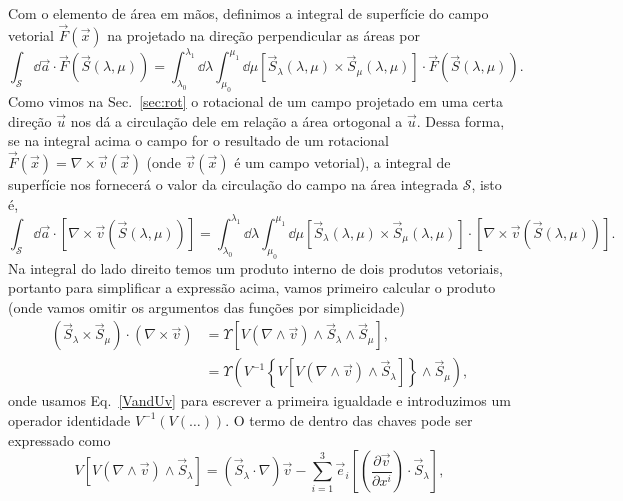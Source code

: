 Com o elemento de área em mãos, definimos a integral de superfície do campo
vetorial $\vec{F}(\vec{x})$ na projetado na direção perpendicular as áreas por
\begin{equation}\label{intsurf}
	\int_{\mathcal{S}} \dd \vec{a}\cdot \vec{F}(\vec{S}(\lambda,\mu)) = \int_{\lambda_0}^{\lambda_1}\dd \lambda\int_{\mu_0}^{\mu_1}\dd \mu \left[\vec{S}_\lambda(\lambda,\mu)\times\vec{S}_\mu(\lambda,\mu)\right]\cdot \vec{F}(\vec{S}(\lambda,\mu)).
\end{equation}
Como vimos  na Sec.~\ref{sec:rot} o rotacional de um campo projetado em uma
certa direção $\vec{u}$ nos dá a circulação dele em relação a área ortogonal a
$\vec{u}$. Dessa forma, se na integral acima o campo for o resultado de um
rotacional $\vec{F}(\vec{x}) = \nabla\times\vec{v}(\vec{x})$ (onde
$\vec{v}(\vec{x})$ é um campo vetorial), a integral de superfície nos fornecerá
o valor da circulação do campo na área integrada $\mathcal{S}$, isto é,
\begin{equation}
	\int_{\mathcal{S}} \dd \vec{a}\cdot \left[\nabla\times\vec{v}\left(\vec{S}(\lambda,\mu)\right)\right] =  \int_{\lambda_0}^{\lambda_1}\dd \lambda\int_{\mu_0}^{\mu_1}\dd \mu \left[\vec{S}_\lambda(\lambda,\mu)\times\vec{S}_\mu(\lambda,\mu)\right]\cdot\left[\nabla\times\vec{v}\left(\vec{S}(\lambda,\mu)\right)\right].
\end{equation}
Na integral do lado direito temos um produto interno de dois produtos vetoriais,
portanto para simplificar a expressão acima, vamos primeiro calcular o produto
(onde vamos omitir os argumentos das funções por simplicidade)
\begin{align}
	\left(\vec{S}_\lambda\times\vec{S}_\mu\right)\cdot\left(\nabla\times\vec{v}\right) & = \Upsilon\left[V\left(\nabla\wedge\vec{v}\right)\wedge\vec{S}_\lambda\wedge\vec{S}_\mu\right],                                   \\
	                                                                                   & =\Upsilon\left(V^{-1}\left\{V\left[V\left(\nabla\wedge\vec{v}\right)\wedge\vec{S}_\lambda\right]\right\}\wedge\vec{S}_\mu\right),
\end{align}
onde usamos Eq.~\eqref{VandUv} para escrever a primeira igualdade e introduzimos
um operador identidade $V^{-1}(V(\dots))$. O termo de dentro das chaves pode ser
expressado como
\begin{equation}
	V\left[V\left(\nabla\wedge\vec{v}\right)\wedge\vec{S}_\lambda\right] = (\vec{S}_\lambda\cdot\nabla)\vec{v} - \sum_{i=1}^3\vec{e}_i\left[\left(\frac{\partial \vec{v}}{\partial x^i}\right)\cdot\vec{S}_\lambda\right],
\end{equation}
